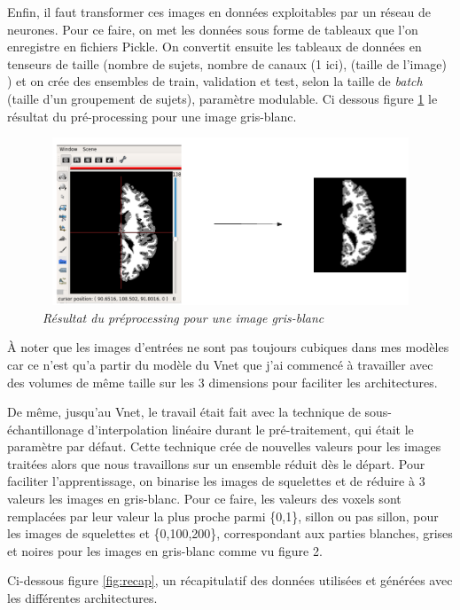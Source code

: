 \documentclass[12pt, oneside, a4paper, titlepage]{article}
\begin{document}
Enfin, il faut transformer ces images en données exploitables par un réseau de neurones.
Pour ce faire, on met les données sous forme de tableaux que l'on enregistre en fichiers Pickle. On convertit ensuite les tableaux de données en tenseurs de taille (nombre de sujets, nombre de canaux (1 ici), (taille de l’image) ) et on crée des ensembles de train, validation et test, selon la taille de \textit{batch} (taille d'un groupement de sujets), paramètre modulable. Ci dessous figure \ref{fig:prepro} le résultat du pré-processing pour une image gris-blanc.\\

\begin{figure}[H]
    \centering
    \includegraphics[width=12cm, height=5cm]{prepro.png}
    \caption{\textit{Résultat du préprocessing pour une image gris-blanc}}
    \label{fig:prepro}
\end{figure}

À noter que les images d'entrées ne sont pas toujours cubiques dans mes modèles car ce n'est qu'a partir du modèle du Vnet que j'ai commencé à travailler avec des volumes de même taille sur les 3 dimensions pour faciliter les architectures.



De même, jusqu'au Vnet, le travail était fait avec la technique de sous-échantillonage d'interpolation linéaire durant le pré-traitement, qui était le paramètre par défaut. Cette technique crée de nouvelles valeurs pour les images traitées alors que nous travaillons sur un ensemble réduit dès le départ. Pour faciliter l'apprentissage, on binarise les images de squelettes et de réduire à 3 valeurs les images en gris-blanc. Pour ce faire, les valeurs des voxels sont remplacées par leur valeur la plus proche parmi \{0,1\}, sillon ou pas sillon, pour les images de squelettes et \{0,100,200\}, correspondant aux parties blanches, grises et noires pour les images en gris-blanc comme vu figure 2.



Ci-dessous figure \ref{fig:recap}, un récapitulatif des données utilisées et générées avec les différentes architectures.
\end{document}

